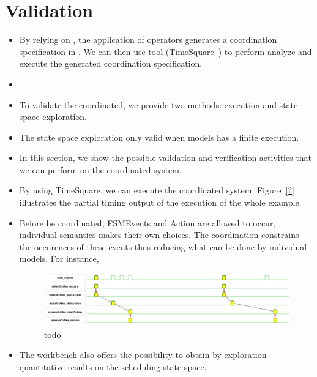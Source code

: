 \section{Validation}
\label{sec:validation}
\begin{itemize}
	\item By relying on \moccml, the application of \bcool operators generates a coordination specification in \ccsl. We can then use \ccsl tool (TimeSquare~\cite{timesquarebib}) to perform analyze and execute the generated coordination specification. 
	
	\item {}
	
	\item To validate the coordinated, we provide two methods: execution and state-space exploration. 
	
	\item The state space exploration only valid when models has a finite execution. 
	
	\item In this section, we show the possible validation and verification activities that we can perform on the coordinated system. 
	
	\item By using TimeSquare, we can execute the coordinated system. Figure~\ref{?} illustrates the partial timing output of the execution of the whole example.
	
	\item Before be coordinated, FSMEvents and Action are allowed to occur, individual semantics makes their own choices. The coordination constrains the occurences of these events thus reducing what can be done by individual models. For instance,     

	\begin{figure}[h]
		\center
		\includegraphics[width=.9\textwidth]{bcool/figs/coffeemachinevcd}
		\caption{todo}
		\label{fig:runningeventvar}
	\end{figure}
	
	\item The workbench also offers the possibility to obtain by exploration quantitative results on the scheduling state-space.
	

\end{itemize}
